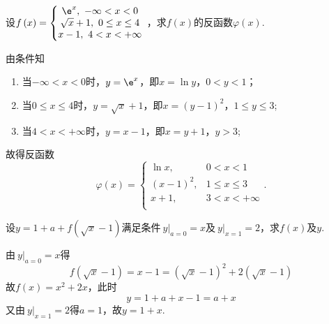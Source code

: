 \begin{problem}设$f\left( x \right) = \left\{ \begin{matrix}
				\e^{x},\ - \infty < x < 0 \\
				\sqrt{x} + 1, \ 0 \leq x \leq 4 \\
				x - 1,\ 4 < x < + \infty \\
				\end{matrix} \right.\ $，求$f\left( x \right)$的反函数$\varphi\left( x \right)$.
				
\begin{solution}由条件知
	\begin{enumerate}
		\item 当$- \infty < x < 0$时，$y = \e^{x}$，即$x = \ln y$，$0 < y < 1$；
		\item 当$0 \leq x \leq 4$时，$y = \sqrt{x} + 1$，即$x = \left( y - 1 \right)^{2}$，$1 \leq y \leq 3$;
		\item 当$4 < x < + \infty$时，$y = x - 1$，即$x = y + 1$，$y > 3$;
	\end{enumerate}
	
	故得反函数 $$\varphi\left( x \right) = \left\{ \begin{matrix}
	\ln x,  & 0 < x < 1 \\
	\left( x - 1 \right)^{2}, & 1 \leq x \leq 3 \\
	x + 1, & 3 < x < + \infty \\
	\end{matrix} \right. .$$		
\end{solution}   
\end{problem}



\begin{problem}设$y = 1 + a + f\left( \sqrt{x} - 1 \right)$满足条件$\left. \ y \right|_{a = 0} = x$及$\left. \ y \right|_{x = 1} = 2$，求$f\left( x \right)$及$y$.
	
	\begin{solution} 由$\left. \ y \right|_{a = 0} = x$得
		$$f\left( \sqrt{x} - 1 \right) = x - 1 = \left( \sqrt{x} - 1 \right)^{2} + 2\left( \sqrt{x} - 1 \right)$$
		故$f\left( x \right) = x^{2} + 2x$，此时
		$$y = 1 + a + x - 1 = a + x$$
		又由$\left. \ y \right|_{x = 1} = 2$得$a = 1$，故$y = 1 + x$.
	\end{solution}   
\end{problem}

